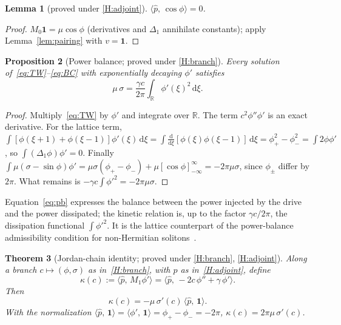 \documentclass[11pt]{article}
\theoremstyle{plain}
\newtheorem{theorem}{Theorem}[section]
\newtheorem{proposition}[theorem]{Proposition}
\newtheorem{lemma}[theorem]{Lemma}
\theoremstyle{definition}
\theoremstyle{remark}
\newcommand{\ip}[2]{\langle #1,\,#2\rangle}
\newcommand{\ph}{\hat p}
\newcommand{\dd}{\mathrm{d}}
\newcommand{\R}{\mathbb{R}}
\newcommand{\one}{\mathbf 1}
\newcommand{\tagC}[1]{\textsf{proved under #1}}
\begin{document}
\begin{lemma}[\tagC{\ref{H:adjoint}}]\label{lem:cos}
$\ip{\ph}{\cos\phi}=0$.
\end{lemma}

\begin{proof}
$M_0\one=\mu\cos\phi$ (derivatives and $\Delta_1$ annihilate constants); apply
Lemma~\ref{lem:pairing} with $v=\one$.
\end{proof}

\begin{proposition}[Power balance; \tagC{\ref{H:branch}}]\label{prop:pb}
Every solution of~\eqref{eq:TW}--\eqref{eq:BC} with exponentially decaying $\phi'$ satisfies
\begin{equation}\label{eq:pb}
  \mu\,\sigma=\frac{\gamma c}{2\pi}\int_\R\phi'(\xi)^2\,\dd\xi .
\end{equation}
\end{proposition}

\begin{proof}
Multiply~\eqref{eq:TW} by $\phi'$ and integrate over $\R$. The term $c^2\phi''\phi'$ is an
exact derivative. For the lattice term,
$\int[\phi(\xi+1)+\phi(\xi-1)]\phi'(\xi)\,\dd\xi=\int\frac{\dd}{\dd\xi}[\phi(\xi)\phi(\xi-1)]\,\dd\xi
=\phi_+^2-\phi_-^2=\int2\phi\phi'$, so $\int(\Delta_1\phi)\phi'=0$. Finally
$\int\mu(\sigma-\sin\phi)\phi'=\mu\sigma(\phi_+-\phi_-)+\mu[\cos\phi]_{-\infty}^{\infty}=-2\pi\mu\sigma$,
since $\phi_\pm$ differ by $2\pi$. What remains is $-\gamma c\int\phi'^2=-2\pi\mu\sigma$.
\end{proof}

Equation~\eqref{eq:pb} expresses the balance between the power injected by the drive and
the power dissipated; the kinetic relation is, up to the factor $\gamma c/2\pi$, the
dissipation functional $\int\phi'^2$. It is the lattice counterpart of the power-balance
admissibility condition for non-Hermitian solitons~\cite{VK-NH}.

\begin{theorem}[Jordan-chain identity; \tagC{\ref{H:branch}, \ref{H:adjoint}}]\label{thm:main}
Along a branch $c\mapsto(\phi,\sigma)$ as in~\ref{H:branch}, with $\ph$ as in~\ref{H:adjoint},
define
\begin{equation}\label{eq:kappa}
  \kappa(c):=\ip{\ph}{M_1\phi'}=\ip{\ph}{-2c\,\phi''+\gamma\,\phi'} .
\end{equation}
Then
\begin{equation}\label{eq:identity}
  \kappa(c)=-\mu\,\sigma'(c)\,\ip{\ph}{\one}.
\end{equation}
With the normalization $\ip{\ph}{\one}=\ip{\phi'}{\one}=\phi_+-\phi_-=-2\pi$,
$\kappa(c)=2\pi\mu\,\sigma'(c)$.
\end{theorem}
\end{document}

